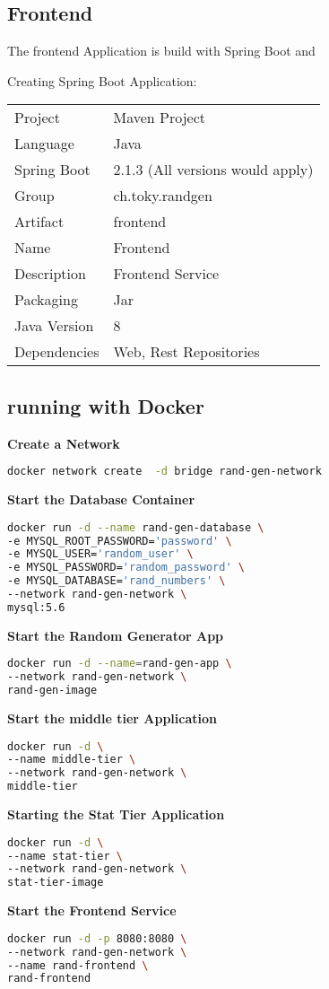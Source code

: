 \subsection{Frontend}
The frontend Application is build with Spring Boot and 

Creating Spring Boot Application:
\begin{tabbing}
\begin{tabular}{ll}
Project & Maven Project \\
Language & Java \\
Spring Boot & 2.1.3 (All versions would apply) \\
Group & ch.toky.randgen \\
Artifact & frontend \\
Name & Frontend \\
Description & Frontend Service \\
Packaging & Jar \\
Java Version & 8 \\
Dependencies & Web, Rest Repositories
\end{tabular}
\end{tabbing}


\subsection{running with Docker}

\textbf{Create a Network}
\begin{lstlisting}[language=Bash]
docker network create  -d bridge rand-gen-network
\end{lstlisting}

\textbf{Start the Database Container}

\begin{lstlisting}[language=Bash]
docker run -d --name rand-gen-database \
-e MYSQL_ROOT_PASSWORD='password' \
-e MYSQL_USER='random_user' \
-e MYSQL_PASSWORD='random_password' \
-e MYSQL_DATABASE='rand_numbers' \
--network rand-gen-network \
mysql:5.6
\end{lstlisting}

\textbf{Start the Random Generator App}
\begin{lstlisting}[language=Bash]
docker run -d --name=rand-gen-app \
--network rand-gen-network \
rand-gen-image
\end{lstlisting}

\textbf{Start the middle tier Application}
\begin{lstlisting}[language=Bash]
docker run -d \
--name middle-tier \
--network rand-gen-network \
middle-tier
\end{lstlisting}

\textbf{Starting the Stat Tier Application}
\begin{lstlisting}[language=Bash]
docker run -d \
--name stat-tier \
--network rand-gen-network \ 
stat-tier-image
\end{lstlisting}

\textbf{Start the Frontend Service}
\begin{lstlisting}[language=Bash]
docker run -d -p 8080:8080 \
--network rand-gen-network \
--name rand-frontend \
rand-frontend
\end{lstlisting}